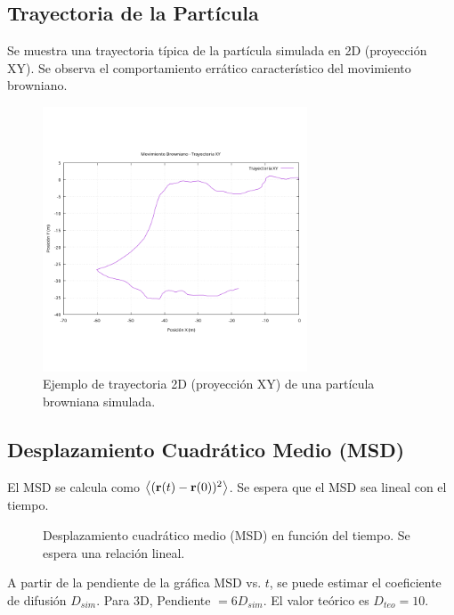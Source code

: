 \documentclass[11pt,a4paper]{article}
\begin{document}
\subsection{Trayectoria de la Partícula}
Se muestra una trayectoria típica de la partícula simulada en 2D (proyección XY). Se observa el comportamiento errático característico del movimiento browniano.
\begin{figure}[h!]
    \centering
    \includegraphics[width=0.7\textwidth]{../results/browniano_sim_plot_trayectoria_xy.png}
    \caption{Ejemplo de trayectoria 2D (proyección XY) de una partícula browniana simulada.}
    \label{fig:trayectoria_informe}
\end{figure}

\subsection{Desplazamiento Cuadrático Medio (MSD)}
El MSD se calcula como $\expval{(\vb{r}(t) - \vb{r}(0))^2}$. Se espera que el MSD sea lineal con el tiempo.
\begin{figure}[h!]
    \centering
    \caption{Desplazamiento cuadrático medio (MSD) en función del tiempo. Se espera una relación lineal.}
    \label{fig:msd_informe}
\end{figure}
A partir de la pendiente de la gráfica MSD vs. $t$, se puede estimar el coeficiente de difusión $D_{sim}$. Para 3D, Pendiente $= 6D_{sim}$. El valor teórico es $D_{teo} = 10$.
\end{document}
